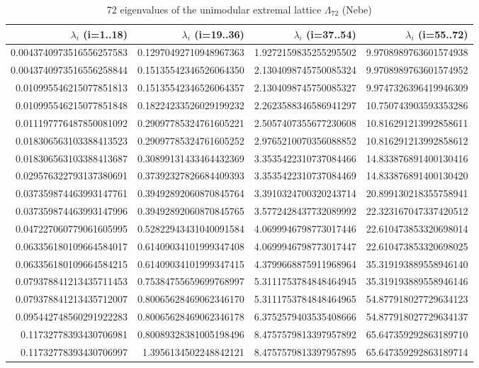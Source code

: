 \documentclass[11pt]{article}
\begin{document}
\begin{table}[htbp]
\centering
\small
\caption{72 eigenvalues of the unimodular extremal lattice $\Lambda_{72}$ (Nebe)}
\label{tab:eigenvalues_Gamma_72}
\begin{tabular}{@{}rrrr@{}}
\toprule
$\lambda_i$ (i=1..18) & $\lambda_i$ (i=19..36) & $\lambda_i$ (i=37..54) & $\lambda_i$ (i=55..72) \\
\midrule
0.0043740973516556257583 & 0.12970492710948967363 & 1.9272159835255295502 & 9.9708989763601574938 \\
0.0043740973516556258844 & 0.15135542346526064350 & 2.1304098745750085324 & 9.9708989763601574952 \\
0.010995546215077851813 & 0.15135542346526064357 & 2.1304098745750085327 & 9.9747326396419946309 \\
0.010995546215077851848 & 0.18224233526029199232 & 2.2623588346586941297 & 10.750743903593353286 \\
0.011197776487850081092 & 0.29097785324761605221 & 2.5057407355677230608 & 10.816291213992858611 \\
0.018306563103388413523 & 0.29097785324761605252 & 2.9765210070356088852 & 10.816291213992858612 \\
0.018306563103388413687 & 0.30899131433464432369 & 3.3535422310737084466 & 14.833876891400130416 \\
0.029576322793137380691 & 0.37392327826684409393 & 3.3535422310737084469 & 14.833876891400130420 \\
0.037359874463993147761 & 0.39492892060870845764 & 3.3910324700320243714 & 20.899130218355758941 \\
0.037359874463993147996 & 0.39492892060870845765 & 3.5772428437732089992 & 22.323167047337420512 \\
0.047227060779061605995 & 0.52822943431040091584 & 4.0699946798773017446 & 22.610473853320698014 \\
0.063356180109664584017 & 0.61409034101999347408 & 4.0699946798773017447 & 22.610473853320698025 \\
0.063356180109664584215 & 0.61409034101999347415 & 4.3799668875911968964 & 35.319193889558946140 \\
0.079378841213435711453 & 0.75384755659699768997 & 5.3111753784848464945 & 35.319193889558946146 \\
0.079378841213435712007 & 0.80065628469062346170 & 5.3111753784848464965 & 54.877918027729634123 \\
0.095442748560291922283 & 0.80065628469062346178 & 6.3752579403535408666 & 54.877918027729634137 \\
0.11732778393430706981 & 0.80089328381005198496 & 8.4757579813397957892 & 65.647359292863189710 \\
0.11732778393430706997 & 1.3956134502248842121 & 8.4757579813397957895 & 65.647359292863189714 \\
\bottomrule
\end{tabular}
\end{table}
\end{document}
